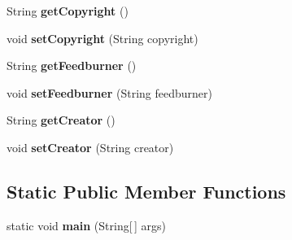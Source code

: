 \begin{DoxyCompactItemize}
\item 
\hypertarget{classgov_1_1fnal_1_1ppd_1_1dd_1_1xml_1_1news_1_1Channel_a3f42e0b6e326c05abd5bb341edd60ffb}{String {\bfseries get\-Copyright} ()}\label{classgov_1_1fnal_1_1ppd_1_1dd_1_1xml_1_1news_1_1Channel_a3f42e0b6e326c05abd5bb341edd60ffb}

\item 
\hypertarget{classgov_1_1fnal_1_1ppd_1_1dd_1_1xml_1_1news_1_1Channel_a22f26f33069c0262649cb30b5bc5202b}{void {\bfseries set\-Copyright} (String copyright)}\label{classgov_1_1fnal_1_1ppd_1_1dd_1_1xml_1_1news_1_1Channel_a22f26f33069c0262649cb30b5bc5202b}

\item 
\hypertarget{classgov_1_1fnal_1_1ppd_1_1dd_1_1xml_1_1news_1_1Channel_adefc7eb7746fa74d5bda4f555f667344}{String {\bfseries get\-Feedburner} ()}\label{classgov_1_1fnal_1_1ppd_1_1dd_1_1xml_1_1news_1_1Channel_adefc7eb7746fa74d5bda4f555f667344}

\item 
\hypertarget{classgov_1_1fnal_1_1ppd_1_1dd_1_1xml_1_1news_1_1Channel_a9fc86bfa7a67dce90e2f9e2278821a78}{void {\bfseries set\-Feedburner} (String feedburner)}\label{classgov_1_1fnal_1_1ppd_1_1dd_1_1xml_1_1news_1_1Channel_a9fc86bfa7a67dce90e2f9e2278821a78}

\item 
\hypertarget{classgov_1_1fnal_1_1ppd_1_1dd_1_1xml_1_1news_1_1Channel_a90fa6f945a81a1173402914edb759cba}{String {\bfseries get\-Creator} ()}\label{classgov_1_1fnal_1_1ppd_1_1dd_1_1xml_1_1news_1_1Channel_a90fa6f945a81a1173402914edb759cba}

\item 
\hypertarget{classgov_1_1fnal_1_1ppd_1_1dd_1_1xml_1_1news_1_1Channel_a38850ac66e22e0e8c9211821cb5a13f8}{void {\bfseries set\-Creator} (String creator)}\label{classgov_1_1fnal_1_1ppd_1_1dd_1_1xml_1_1news_1_1Channel_a38850ac66e22e0e8c9211821cb5a13f8}

\end{DoxyCompactItemize}
\subsection*{Static Public Member Functions}
\begin{DoxyCompactItemize}
\item 
\hypertarget{classgov_1_1fnal_1_1ppd_1_1dd_1_1xml_1_1news_1_1Channel_a5ce9889ea4a8c5f5ec02a7e1337f912f}{static void {\bfseries main} (String\mbox{[}$\,$\mbox{]} args)}\label{classgov_1_1fnal_1_1ppd_1_1dd_1_1xml_1_1news_1_1Channel_a5ce9889ea4a8c5f5ec02a7e1337f912f}

\end{DoxyCompactItemize}


